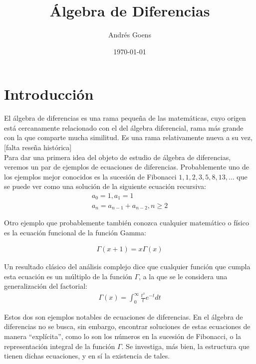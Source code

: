 \documentclass[letterpaper]{article}
\title{\'Algebra de Diferencias}
\author{Andr\'{e}s Goens}
\date{\today}
\theoremstyle{definition}
\begin{document}
\maketitle
\section{Introducci\'on}


El \'algebra de diferencias es una rama peque\~na de las matem\'aticas, cuyo origen est\'a cercanamente relacionado con el del \'algebra diferencial, rama m\'as grande con la que comparte mucha similitud. Es una rama relativamente nueva a su vez, [falta rese\~na hist\'orica]\\

Para dar una primera idea del objeto de estudio de \'algebra de diferencias, veremos un par de ejemplos de ecuaciones de diferencias. Probablemente uno de los ejemplos mejor conocidos es la sucesi\'on de Fibonacci $1,1,2,3,5,8,13,\ldots$ que se puede ver como una soluci\'on de la siguiente ecuaci\'on recursiva: 
\begin{align*}
a_0 = 1,  a_1 = 1 \\ a_n = a_{n-1} + a_{n-2}, n\geq 2
\end{align*}

Otro ejemplo que probablemente tambi\'en conozca cualquier matem\'atico o f\'isico es la ecuaci\'on funcional de la funci\'on Gamma:

\begin{align*}
\Gamma(x+1) = x \Gamma(x)
\end{align*}

Un resultado cl\'asico del an\'alisis complejo dice que cualquier funci\'on que cumpla esta ecuaci\'on es un m\'ultiplo de la funci\'on $\Gamma$,
a la que se le considera una generalizaci\'on del factorial:
\begin{align*}
\Gamma(x) = \int_0^\infty{\frac{t^x}{t} e^{-t} dt}
\end{align*}

Estos dos son ejemplos notables de ecuaciones de diferencias. En el \'algebra de diferencias no se busca, sin embargo,
encontrar soluciones de estas ecuaciones de manera ``expl\'icita'', como lo son los n\'umeros en la sucesi\'on de Fibonacci,
o la representaci\'on integral de la funci\'on $\Gamma$. Se investiga, m\'as bien, la estructura que tienen dichas ecuaciones, y en s\'i la existencia de tales. 
\end{document}
